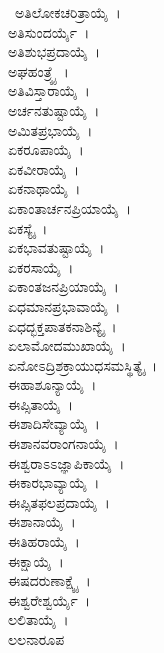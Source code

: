 \ ಅತಿಲೋಕಚರಿತ್ರಾಯೈ~।\\ ಅತಿಸುಂದರ್ಯೈ~।\\ ಅತಿಶುಭಪ್ರದಾಯೈ~।\\ ಅಘಹಂತ್ರ್ಯೈ~।\\ ಅತಿವಿಸ್ತಾರಾಯೈ~।\\ ಅರ್ಚನತುಷ್ಟಾಯೈ~।\\ ಅಮಿತಪ್ರಭಾಯೈ~।\\ ಏಕರೂಪಾಯೈ~।\\ ಏಕವೀರಾಯೈ~।\\ ಏಕನಾಥಾಯೈ~।\\ ಏಕಾಂತಾರ್ಚನಪ್ರಿಯಾಯೈ~।\\ ಏಕಸ್ಯೈ~।\\ ಏಕಭಾವತುಷ್ಟಾಯೈ~।\\ ಏಕರಸಾಯೈ~।\\ ಏಕಾಂತಜನಪ್ರಿಯಾಯೈ~।\\ ಏಧಮಾನಪ್ರಭಾವಾಯೈ~।\\ ಏಧದ್ಭಕ್ತಪಾತಕನಾಶಿನ್ಯೈ~।\\ ಏಲಾಮೋದಮುಖಾಯೈ~।\\ ಏನೋಽದ್ರಿಶಕ್ರಾಯುಧಸಮಸ್ಥಿತ್ಯೈ~।\\ ಈಹಾಶೂನ್ಯಾಯೈ~।\\ ಈಪ್ಸಿತಾಯೈ~।\\ ಈಶಾದಿಸೇವ್ಯಾಯೈ~।\\ ಈಶಾನವರಾಂಗನಾಯೈ~।\\ ಈಶ್ವರಾಽಽಜ್ಞಾಪಿಕಾಯೈ~।\\ ಈಕಾರಭಾವ್ಯಾಯೈ~।\\ ಈಪ್ಸಿತಫಲಪ್ರದಾಯೈ~।\\ ಈಶಾನಾಯೈ~।\\ ಈತಿಹರಾಯೈ~।\\ ಈಕ್ಷಾಯೈ~।\\ ಈಷದರುಣಾಕ್ಷ್ಯೈ~।\\ ಈಶ್ವರೇಶ್ವರ್ಯೈ~।\\ ಲಲಿತಾಯೈ~।\\ ಲಲನಾರೂಪ